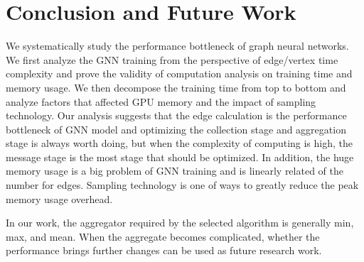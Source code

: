 \section{Conclusion and Future Work}

We systematically study the performance bottleneck of graph neural networks. We first analyze the GNN training
from the perspective of edge/vertex time complexity and prove the validity of computation analysis on training
time and memory usage. We then decompose the training time from top to bottom and analyze factors that affected GPU memory and
the impact of sampling technology. Our analysis suggests that the edge calculation is the performance bottleneck of GNN model
and optimizing the collection stage and aggregation stage is always worth doing, but when the complexity of computing is high, the message stage is
the most stage that should be optimized. In addition, the huge memory usage is a big problem of GNN training and is linearly related of the number for edges.
Sampling technology is one of ways to greatly reduce the peak memory usage overhead.

In our work, the aggregator required by the selected algorithm is generally min, max, and mean.
When the aggregate becomes complicated, whether the performance brings further changes can be used as future research work.